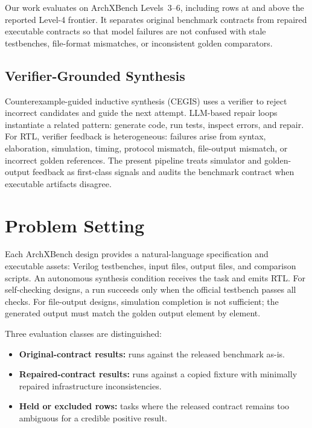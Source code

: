 \documentclass[sigconf,anonymous]{acmart}
\newcommand{\arch}{ArchXBench\xspace}
\begin{document}
Our work evaluates on \arch Levels~3--6, including rows at and above the reported Level-4 frontier.
It separates original benchmark contracts from repaired executable contracts so that model failures are not confused with stale testbenches, file-format mismatches, or inconsistent golden comparators.

\subsection{Verifier-Grounded Synthesis}

Counterexample-guided inductive synthesis (CEGIS) uses a verifier to reject incorrect candidates and guide the next attempt.
LLM-based repair loops instantiate a related pattern: generate code, run tests, inspect errors, and repair.
For RTL, verifier feedback is heterogeneous: failures arise from syntax, elaboration, simulation, timing, protocol mismatch, file-output mismatch, or incorrect golden references.
The present pipeline treats simulator and golden-output feedback as first-class signals and audits the benchmark contract when executable artifacts disagree.

\section{Problem Setting}

Each \arch design provides a natural-language specification and executable assets: Verilog testbenches, input files, output files, and comparison scripts.
An autonomous synthesis condition receives the task and emits RTL.
For self-checking designs, a run succeeds only when the official testbench passes all checks.
For file-output designs, simulation completion is not sufficient; the generated output must match the golden output element by element.

Three evaluation classes are distinguished:
\begin{itemize}[leftmargin=*]
    \item \textbf{Original-contract results:} runs against the released benchmark as-is.
    \item \textbf{Repaired-contract results:} runs against a copied fixture with minimally repaired infrastructure inconsistencies.
    \item \textbf{Held or excluded rows:} tasks where the released contract remains too ambiguous for a credible positive result.
\end{itemize}
\end{document}
